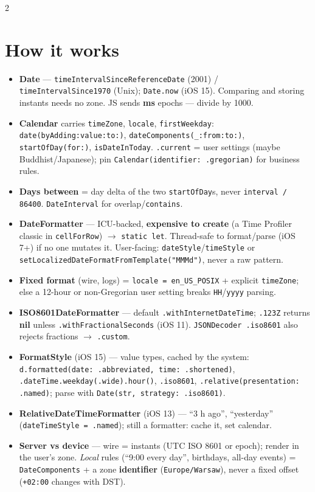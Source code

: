 \documentclass[8pt]{extarticle}
\begin{document}
\begin{multicols}{2}
\section{How it works}
\begin{itemize}
  \item \textbf{Date} — \texttt{timeIntervalSinceReferenceDate} (2001) /
        \texttt{timeIntervalSince1970} (Unix); \texttt{Date.now} (iOS 15). Comparing
        and storing instants needs no zone. JS sends \textbf{ms} epochs — divide by 1000.
  \item \textbf{Calendar} carries \texttt{timeZone}, \texttt{locale},
        \texttt{firstWeekday}: \texttt{date(byAdding:value:to:)},
        \texttt{dateComponents(\_:from:to:)}, \texttt{startOfDay(for:)},
        \texttt{isDateInToday}. \texttt{.current} = user settings (maybe Buddhist/Japanese); pin
        \texttt{Calendar(identifier: .gregorian)} for business rules.
  \item \textbf{Days between} = day delta of the two \texttt{startOfDay}s, never
        \texttt{interval / 86400}. \texttt{DateInterval} for overlap/\texttt{contains}.
  \item \textbf{DateFormatter} — ICU-backed, \textbf{expensive to create} (a Time
        Profiler classic in \texttt{cellForRow}) $\to$ \texttt{static let}. Thread-safe to
        format/parse (iOS 7+) if no one mutates it. User-facing:
        \texttt{dateStyle}/\texttt{timeStyle} or
        \texttt{setLocalizedDateFormatFromTemplate("MMMd")}, never a raw pattern.
  \item \textbf{Fixed format} (wire, logs) = \texttt{locale = en\_US\_POSIX} + explicit
        \texttt{timeZone}; else a 12-hour or non-Gregorian user setting breaks
        \texttt{HH}/\texttt{yyyy} parsing.
  \item \textbf{ISO8601DateFormatter} — default \texttt{.withInternetDateTime};
        \texttt{.123Z} returns \textbf{nil} unless \texttt{.withFractionalSeconds} (iOS 11).
        \texttt{JSONDecoder .iso8601} also rejects fractions $\to$ \texttt{.custom}.
  \item \textbf{FormatStyle} (iOS 15) — value types, cached by the system:
        \texttt{d.formatted(date: .abbreviated, time: .shortened)},
        \texttt{.dateTime.weekday(.wide).hour()}, \texttt{.iso8601},
        \texttt{.relative(presentation: .named)}; parse with
        \texttt{Date(str, strategy: .iso8601)}.
  \item \textbf{RelativeDateTimeFormatter} (iOS 13) — ``3 h ago'', ``yesterday''
        (\texttt{dateTimeStyle = .named}); still a formatter: cache it, set calendar.
  \item \textbf{Server vs device} — wire = instants (UTC ISO 8601 or epoch); render in the
        user's zone. \emph{Local} rules (``9:00 every day'', birthdays, all-day events) =
        \texttt{DateComponents} + a zone \textbf{identifier} (\texttt{Europe/Warsaw}),
        never a fixed offset (\texttt{+02:00} changes with DST).
\end{itemize}


\end{multicols}
\end{document}
